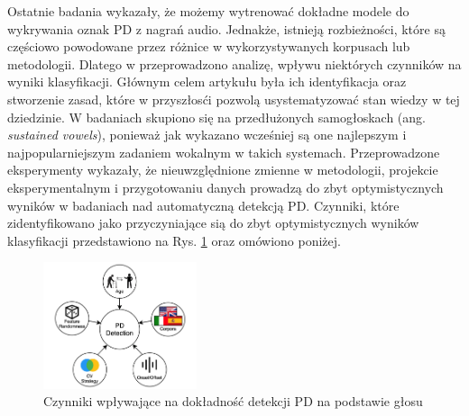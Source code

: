 Ostatnie badania wykazały, że możemy wytrenować dokładne modele do wykrywania oznak PD z nagrań audio.
Jednakże, istnieją rozbieżności, które są częściowo powodowane przez różnice w
wykorzystywanych korpusach lub metodologii.
Dlatego w  \cite{SustainedVowelsProblems} przeprowadzono analizę, wpływu niektórych czynników na wyniki klasyfikacji.
Głównym celem artykułu była ich identyfikacja oraz stworzenie zasad, które w przyszłosći pozwolą usystematyzować
stan wiedzy w tej dziedzinie.
W badaniach skupiono się na przedłużonych samogłoskach (ang. \emph{sustained vowels}), ponieważ jak wykazano wcześniej
są one najlepszym i najpopularniejszym zadaniem wokalnym w takich systemach.
Przeprowadzone eksperymenty wykazały, że nieuwzględnione zmienne w metodologii, projekcie eksperymentalnym i
przygotowaniu danych prowadzą do zbyt optymistycznych wyników w badaniach nad automatyczną detekcją PD.
Czynniki, które zidentyfikowano jako przyczyniające sią do zbyt optymistycznych wyników klasyfikacji
przedstawiono na Rys. \ref{fig:factors_PD_detection} oraz omówiono poniżej.


\begin{figure}[htbp]
	\centering
	\includegraphics[width=0.4\textwidth]{./img/influence_of_factors_on_PD_detection}
	\caption{Czynniki wpływające na dokładność detekcji PD na podstawie głosu \cite{SustainedVowelsProblems}}
    \label{fig:factors_PD_detection}
\end{figure}


